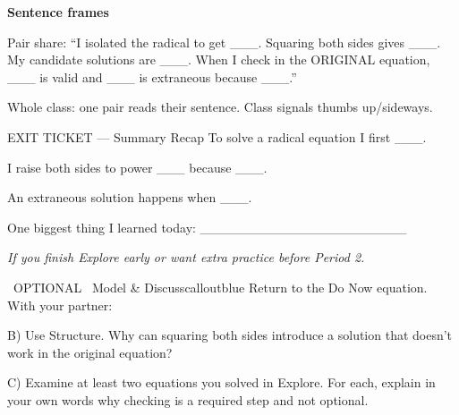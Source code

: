 \documentclass[11pt]{article}
\begin{document}


\begin{sentenceframebox}
\textbf{Sentence frames}

Pair share: ``I isolated the radical to get \_\_\_. Squaring both sides gives \_\_\_. My candidate solutions are \_\_\_. When I check in the ORIGINAL equation, \_\_\_ is valid and \_\_\_ is extraneous because \_\_\_.'' 

Whole class: one pair reads their sentence. Class signals thumbs up/sideways.
\end{sentenceframebox}


\begin{summaryexitbox}{EXIT TICKET --- Summary Recap}
To solve a radical equation I first \_\_\_.

I raise both sides to power \_\_\_ because \_\_\_.

An extraneous solution happens when \_\_\_.

One biggest thing I learned today: \_\_\_\_\_\_\_\_\_\_\_\_\_\_\_\_\_\_\_\_\_\_
\end{summaryexitbox}

\clearpage

\textit{If you finish Explore early or want extra practice before Period 2.}

\begin{callout}{\IconSearch\ OPTIONAL \textperiodcentered\ Model \& Discuss}{calloutblue}
Return to the Do Now equation. With your partner:

B) Use Structure. Why can squaring both sides introduce a solution that doesn't work in the original equation?

C) Examine at least two equations you solved in Explore. For each, explain in your own words why checking is a required step and not optional.
\end{callout}

\end{document}
